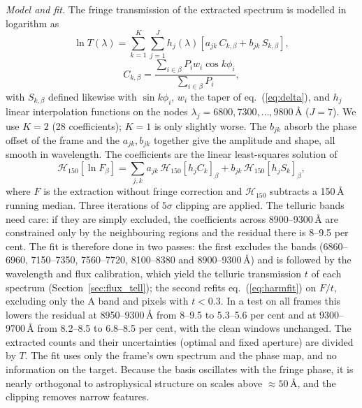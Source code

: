 \textit{Model and fit.} The fringe transmission of the extracted spectrum is modelled in logarithm as
\begin{equation}
\ln T(\lambda)=\sum_{k=1}^{K}\sum_{j=1}^{J}h_j(\lambda)\left[a_{jk}\,C_{k,\beta}+b_{jk}\,S_{k,\beta}\right],
\label{eq:harmonic}
\end{equation}
\begin{equation}
C_{k,\beta}=\frac{\sum_{i\in\beta}P_iw_i\cos k\phi_i}{\sum_{i\in\beta}P_i},
\label{eq:harmproj}
\end{equation}
with $S_{k,\beta}$ defined likewise with $\sin k\phi_i$, $w_i$ the taper of eq.~(\ref{eq:delta}), and $h_j$ linear
interpolation functions on the nodes $\lambda_j=6800,7300,\dots,9800$\,\AA{} ($J=7$). We use $K=2$ (28 coefficients);
$K=1$ is only slightly worse. The $b_{jk}$ absorb the phase offset of the frame and the $a_{jk},b_{jk}$ together give
the amplitude and shape, all smooth in wavelength. The coefficients are the linear least-squares solution of
\begin{equation}
\mathcal{H}_{150}[\ln F_\beta]=\sum_{j,k}a_{jk}\,\mathcal{H}_{150}[h_jC_k]_\beta+b_{jk}\,\mathcal{H}_{150}[h_jS_k]_\beta,
\label{eq:harmfit}
\end{equation}
where $F$ is the extraction without fringe correction and $\mathcal{H}_{150}$ subtracts a 150\,\AA{} running median.
Three iterations of $5\sigma$ clipping are applied. The telluric bands need care: if they are simply excluded,
the coefficients across 8900--9300\,\AA{} are constrained only by the neighbouring regions and the residual there
is 8--9.5 per cent. The fit is therefore done in two passes: the first excludes
the bands (6860--6960, 7150--7350, 7560--7720, 8100--8380 and 8900--9300\,\AA) and is followed by the wavelength and
flux calibration, which yield the telluric transmission $t$ of each spectrum (Section~\ref{sec:flux_tell}); the second
refits eq.~(\ref{eq:harmfit}) on $F/t$, excluding only the A band and pixels with $t<0.3$. In a test on all frames this
lowers the residual at 8950--9300\,\AA{} from 8--9.5 to 5.3--5.6 per cent and at 9300--9700\,\AA{} from 8.2--8.5 to
6.8--8.5 per cent, with the clean windows unchanged. The extracted counts and their
uncertainties (optimal and fixed aperture) are divided by $T$. The fit uses only the frame's own spectrum and the phase
map, and no information on the target. Because the basis oscillates with the fringe phase, it is nearly orthogonal to
astrophysical structure on scales above $\approx50$\,\AA, and the clipping removes narrow features.

